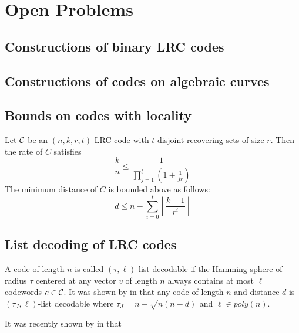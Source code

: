 \chapter{Open Problems}
\cite{MR_LRC}
\section{Constructions of binary LRC codes}
\cite{binary_constructions}

\section{Constructions of codes on algebraic curves}
\cite{LRC_on_alg_curves, LRC_on_alg_curves2, LRC_fibers}

\section{Bounds on codes with locality}
\cite{combinatorial_bounds}
\cite{bounds_on_LRC}
\cite{bounds_on_LRC_t}

\begin{thm}
Let ${\mathcal C}$ be an $(n,k,r,t)$ LRC code with $t$ disjoint recovering sets of size $r$. Then the rate of $C$ satisfies
\begin{equation}
\frac{k}{n} \leq \frac{1}{\prod_{j=1}^t(1+\frac{1}{jr})}
\end{equation}
The minimum distance of $C$ is bounded above as follows:
\begin{equation}
d \leq n - \sum_{i=0}^t \left\lfloor \frac{k-1}{r^i} \right\rfloor
\end{equation}
\end{thm}

\section{List decoding of LRC codes}


A code of length $n$ is called $(\tau,\ell)$-list decodable if the Hamming sphere of radius $\tau$ centered at any vector $v$ of length $n$ always contains at most $\ell$ codewords $c \in {\mathcal C}$. It was shown by \citeauthor{list_decoding} in \cite{list_decoding} that any code of length $n$ and distance $d$ is $(\tau_J, \ell)$-list decodable where $\tau_J = n - \sqrt{n(n-d)}$ and $\ell \in poly(n)$.

It was recently shown by \citeauthor{list_decoding_LRC} in \cite{list_decoding_LRC} that 